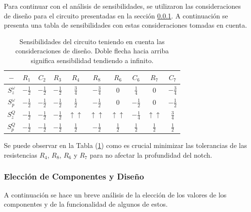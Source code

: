 Para continuar con el análisis de sensibilidades, se utilizaron las consideraciones de diseño para el circuito presentadas en la sección \ref{sec:eleccion_componentes}. A continuación se presenta una tabla de sensibilidades con estas consideraciones tomadas en cuenta.


\begin{table}[H]
\centering
\begin{tabular}{@{}cccccccccc@{}}
\toprule
$-$ & $R_1$ & $C_2$ & $R_3$ & $R_4$ & $R_8$ & $R_6$ & $C_6$ & $R_7$ & $C_7$  \\ \midrule


$S^\omega_z$ & $-\frac{1}{2}$ & $-\frac{1}{2}$ & $-\frac{1}{2}$ & $\frac{3}{4}$ & $-\frac{3}{4}$ & $0$ & $\frac{1}{4}$ & $0$ & $-\frac{3}{4}$ \\


$S^\omega_p$ & $-\frac{1}{2}$ & $-\frac{1}{2}$ & $-\frac{1}{2}$ & $\frac{1}{2}$ & $-\frac{1}{2}$ & $0$ & $-\frac{1}{2}$ & $0$ & $-\frac{1}{2}$ \\


$S^Q_z$ & $-\frac{1}{2}$ & $-\frac{1}{2}$  & $-\frac{1}{2}$ & $\uparrow \uparrow$ & $\uparrow \uparrow$ & $\uparrow \uparrow$ & $-\frac{1}{4}$ & $\uparrow \uparrow$ & $\frac{3}{4}$\\


$S^Q_p$ & $-\frac{1}{2}$ & $-\frac{1}{2}$ & $-\frac{1}{2}$ & $\frac{1}{2}$ & $-\frac{1}{2}$ & $\frac{1}{2}$ & $\frac{1}{2}$ & $\frac{1}{2}$ & $\frac{1}{2}$\\ \bottomrule


\end{tabular}
\caption{Sensibilidades del circuito teniendo en cuenta las consideraciones de diseño. Doble flecha hacia arriba significa sensibilidad tendiendo a infinito.}
\label{tab:sens}
\end{table}

Se puede observar en la Tabla (\ref{tab:sens}) como es crucial minimizar las tolerancias de las resistencias $R_4$, $R_8$, $R_6$ y $R_7$ para no afectar la profundidad del notch. 

\subsubsection{Elección de Componentes y Diseño}
\label{sec:eleccion_componentes}

A continuación se hace un breve análisis de la elección de los valores de los componentes y de la funcionalidad de algunos de estos.


